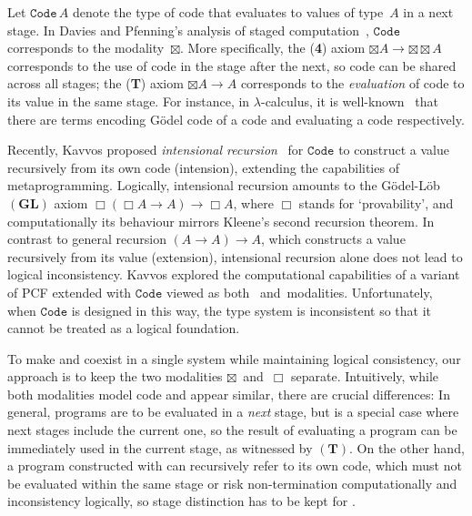 \documentclass[draft,a4paper,UKenglish,numberwithinsect,cleveref,thm-restate]{lipics-v2021}
\numberwithin{equation}{section}
\theoremstyle{definition}
\theoremstyle{plain}
\begin{document}
Let $\mathtt{Code}\,A$ denote the type of code that evaluates to values of type~$A$ in a next stage.
In Davies and Pfenning's analysis of staged computation~\cite{Davies2001b}, $\mathtt{Code}$ corresponds to the \SFour modality~$\boxtimes$.
More specifically, the (\textbf{4}) axiom $\boxtimes A \to {\boxtimes} {\boxtimes} A$ corresponds to the use of code in the stage after the next, so code can be shared across all stages;
the (\textbf{T}) axiom $\boxtimes A \to A$ corresponds to the \emph{evaluation} of code to its value in the same stage.
For instance, in $\lambda$-calculus, it is well-known~\cite{Barendregt1984a} that there are terms encoding Gödel code of a code and evaluating a code respectively.

Recently, Kavvos proposed \emph{intensional recursion}~\cite{Kavvos2017a} for $\mathtt{Code}$ to construct a value recursively from its own code (intension), extending the capabilities of metaprogramming.
Logically, intensional recursion amounts to the Gödel-Löb $(\mathbf{GL})$ axiom $\Box (\Box A \to A) \to \Box A$, where $\Box$ stands for `provability', and computationally its behaviour mirrors Kleene's second recursion theorem.
In contrast to general recursion $(A \to A) \to A$, which constructs a value recursively from its value (extension), intensional recursion alone does not lead to logical inconsistency.
Kavvos explored the computational capabilities of a variant of PCF extended with $\mathtt{Code}$ viewed as both \SFour~and~\GL modalities.
Unfortunately, when $\mathtt{Code}$ is designed in this way, the type system is inconsistent so that it cannot be treated as a logical foundation.

To make \SFour and \GL coexist in a single system while maintaining logical consistency, our approach is to keep the two modalities $\boxtimes$~and~$\Box$ separate.
Intuitively, while both modalities model code and appear similar, there are crucial differences:
In general, programs are to be evaluated in a \emph{next} stage, but \SFour is a special case where next stages include the current one, so the result of evaluating a program can be immediately used in the current stage, as witnessed by $(\mathbf{T})$.
On the other hand, a program constructed with \GL can recursively refer to its own code, which must not be evaluated within the same stage or risk non-termination computationally and inconsistency logically, so stage distinction has to be kept for \GL.
\end{document}
